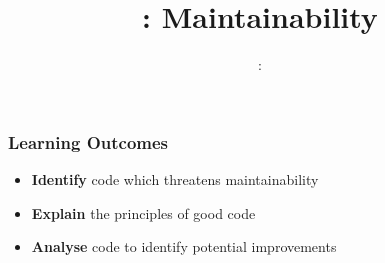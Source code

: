 \usepackage{../../beamerthemeFalmouthGamesAcademy}
\usepackage{multimedia}
\graphicspath{ {../../} }

\usepackage{textcomp}


\usepackage[normalem]{ulem}
\usepackage{wasysym}

\usepackage{pdfpages}

\usetikzlibrary{arrows,automata}





\title{\sessionnumber: Maintainability}
\subtitle{\modulecode: \moduletitle}

\frame{\titlepage} 

\begin{frame}
	\frametitle{Learning Outcomes}
	\begin{itemize}
		\item \textbf{Identify} code which threatens maintainability
		\item \textbf{Explain} the principles of good code
		\item\textbf{Analyse} code to identify potential improvements
	\end{itemize}
\end{frame}

%





